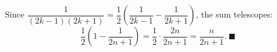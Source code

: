 Since $\dfrac1{(2k-1)(2k+1)}=\dfrac12\left(\dfrac1{2k-1}-\dfrac1{2k+1}\right)$, the sum telescopes:
\[\dfrac12\left(1-\dfrac1{2n+1}\right)=\dfrac12\cdot\dfrac{2n}{2n+1}=\dfrac{n}{2n+1}.\ \blacksquare\]
